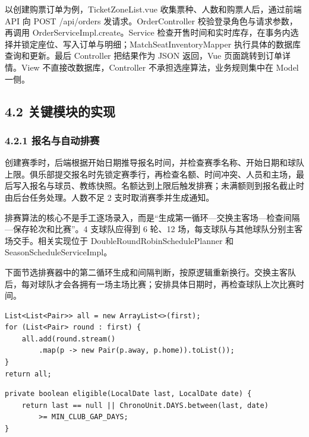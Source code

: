 \documentclass[UTF8,zihao=-4,a4paper]{ctexart}
\begin{document}
以创建购票订单为例，TicketZoneList.vue 收集票种、人数和购票人后，通过前端 API 向 POST /api/orders 发请求。OrderController 校验登录角色与请求参数，再调用 OrderServiceImpl.create。Service 检查开售时间和实时库存，在事务内选择并锁定座位、写入订单与明细；MatchSeatInventoryMapper 执行具体的数据库查询和更新。最后 Controller 把结果作为 JSON 返回，Vue 页面跳转到订单详情。View 不直接改数据库，Controller 不承担选座算法，业务规则集中在 Model 一侧。


\subsection*{4.2 关键模块的实现}

\subsubsection*{4.2.1 报名与自动排赛}

创建赛季时，后端根据开始日期推导报名时间，并检查赛季名称、开始日期和球队上限。俱乐部提交报名时先锁定赛季行，再检查名额、时间冲突、人员和主场，最后写入报名与球员、教练快照。名额达到上限后触发排赛；未满额则到报名截止时由后台任务处理。人数不足 2 支时取消赛季并生成通知。


排赛算法的核心不是手工逐场录入，而是“生成第一循环—交换主客场—检查间隔—保存轮次和比赛”。4 支球队应得到 6 轮、12 场，每支球队与其他球队分别主客场交手。相关实现位于 DoubleRoundRobinSchedulePlanner 和 SeasonScheduleServiceImpl。


下面节选排赛器中的第二循环生成和间隔判断，按原逻辑重新换行。交换主客队后，每对球队才会各拥有一场主场比赛；安排具体日期时，再检查球队上次比赛时间。


\noindent\begin{minipage}{\linewidth}\small\begin{verbatim}
List<List<Pair>> all = new ArrayList<>(first);
for (List<Pair> round : first) {
    all.add(round.stream()
        .map(p -> new Pair(p.away, p.home)).toList());
}
return all;
\end{verbatim}\end{minipage}\par

\noindent\begin{minipage}{\linewidth}\small\begin{verbatim}
private boolean eligible(LocalDate last, LocalDate date) {
    return last == null || ChronoUnit.DAYS.between(last, date)
        >= MIN_CLUB_GAP_DAYS;
}
\end{verbatim}\end{minipage}\par
\end{document}
